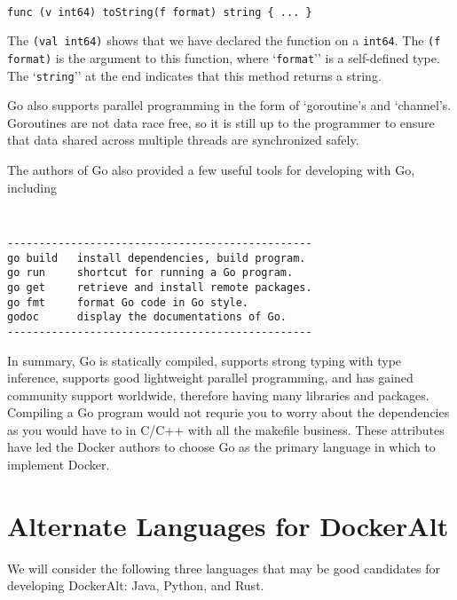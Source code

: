 \documentclass[letterpaper,twocolumn,10pt]{article}
\begin{document}
{\tt \small
\begin{verbatim}
func (v int64) toString(f format) string { ... }
\end{verbatim}
}

\noindent
The {\tt (val int64)} shows that we have declared the function on a {\tt int64}. The {\tt (f format)} is the argument to this function, where `{\tt format}'' is a self-defined type. The `{\tt string}'' at the end indicates that this method returns a string.

Go also supports parallel programming in the form of `goroutine's and `channel's. Goroutines are not data race free, so it is still up to the programmer to ensure that data shared across multiple threads are synchronized safely.

The authors of Go also provided a few useful tools for developing with Go, including
{\tt \small
\begin{verbatim}
------------------------------------------------
go build   install dependencies, build program.
go run     shortcut for running a Go program.
go get     retrieve and install remote packages.
go fmt     format Go code in Go style.
godoc      display the documentations of Go.
------------------------------------------------
\end{verbatim}
}

\noindent
In summary, Go is statically compiled, supports strong typing with type inference, supports good lightweight parallel programming, and has gained community support worldwide, therefore having many libraries and packages. Compiling a Go program would not requrie you to worry about the dependencies as you would have to in C/C++ with all the makefile business. These attributes have led the Docker authors to choose Go as the primary language in which to implement Docker.

\section{Alternate Languages for DockerAlt}

We will consider the following three languages that may be good candidates for developing DockerAlt: Java, Python, and Rust.
\end{document}
